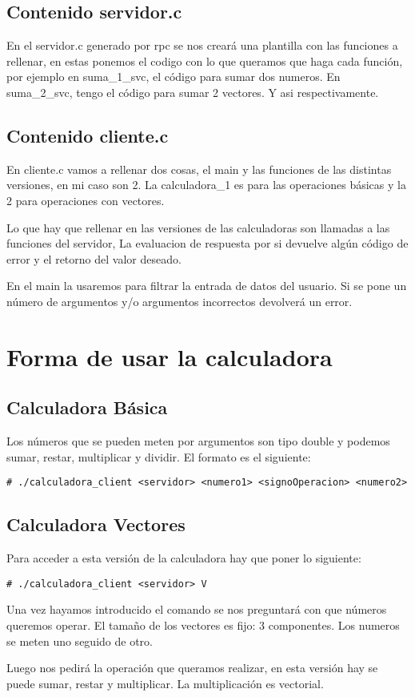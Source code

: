 \documentclass[12pt]{book}
\begin{document}
\section{Contenido servidor.c}
    En el servidor.c generado por rpc se nos creará una plantilla con las funciones a
    rellenar, en estas ponemos el codigo con lo que queramos que haga cada función, por
    ejemplo en suma\_1\_svc, el código para sumar dos numeros. En suma\_2\_svc, tengo el código
    para sumar 2 vectores. Y asi respectivamente.

\section{Contenido cliente.c}
    En cliente.c vamos a rellenar dos cosas, el main y las funciones de las distintas versiones,
    en mi caso son 2. La calculadora\_1 es para las operaciones básicas y la 2 para operaciones
    con vectores.

    Lo que hay que rellenar en las versiones de las calculadoras son llamadas a las funciones del servidor, La
    evaluacion de respuesta por si devuelve algún código de error y el retorno del valor deseado.

    En el main la usaremos para filtrar la entrada de datos del usuario. Si se pone un número de argumentos y/o argumentos
    incorrectos devolverá un error.

\chapter{Forma de usar la calculadora}

\section{Calculadora Básica}

Los números que se pueden meten por argumentos son tipo double y podemos sumar, restar, multiplicar y dividir.
El formato es el siguiente:

\begin{lstlisting}
# ./calculadora_client <servidor> <numero1> <signoOperacion> <numero2>
\end{lstlisting}

\section{Calculadora Vectores}

Para acceder a esta versión de la calculadora hay que poner lo siguiente:

\begin{lstlisting}
# ./calculadora_client <servidor> V
\end{lstlisting}

Una vez hayamos introducido el comando se nos preguntará con que números queremos operar. El tamaño
de los vectores es fijo: 3 componentes. Los numeros se meten uno seguido de otro.

Luego nos pedirá la operación que queramos realizar, en esta versión hay se puede sumar, restar y multiplicar.
La multiplicación es vectorial.
\end{document}
